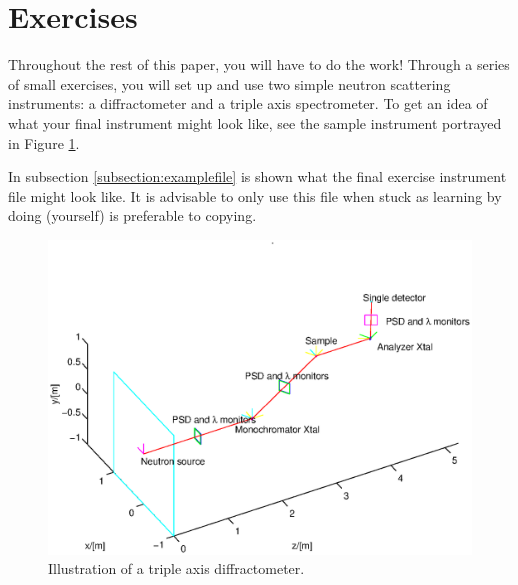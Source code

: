 \section{Exercises}
Throughout the rest of this paper, you will have to do the work!
Through a series of small exercises, you will set up and use two simple
neutron scattering instruments: a diffractometer and a triple axis spectrometer. To get an idea of what your final
instrument might look like, see the sample instrument portrayed in Figure \ref{instr.eps}.

In subsection \ref{subsection:examplefile} is shown what the final exercise instrument file might look like. It is advisable to only use this file when stuck as learning by doing (yourself) is preferable to copying.
\begin{figure}[htb!]
\begin{center}
\includegraphics[width=1\linewidth]{pics/instr.eps}
\end{center}
\caption{Illustration of a triple axis diffractometer.}
\label{instr.eps}
\end{figure}
